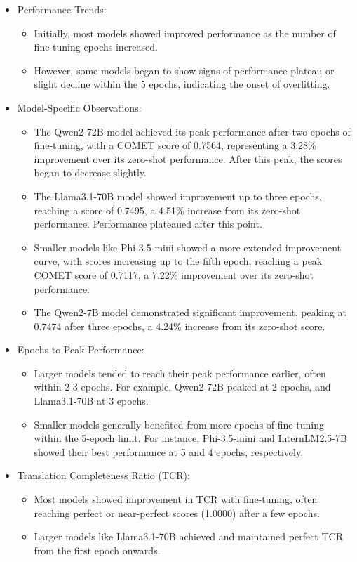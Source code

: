 \documentclass[conference]{IEEEtran}
\begin{document}
\begin{itemize}
    \item Performance Trends:
    \begin{itemize}
        \item Initially, most models showed improved performance as the number of fine-tuning epochs increased.
        \item However, some models began to show signs of performance plateau or slight decline within the 5 epochs, indicating the onset of overfitting.
    \end{itemize}

    \item Model-Specific Observations:
    \begin{itemize}
        \item The Qwen2-72B model achieved its peak performance after two epochs of fine-tuning, with a COMET score of 0.7564, representing a 3.28\% improvement over its zero-shot performance. After this peak, the scores began to decrease slightly.
        \item The Llama3.1-70B model showed improvement up to three epochs, reaching a score of 0.7495, a 4.51\% increase from its zero-shot performance. Performance plateaued after this point.
        \item Smaller models like Phi-3.5-mini showed a more extended improvement curve, with scores increasing up to the fifth epoch, reaching a peak COMET score of 0.7117, a 7.22\% improvement over its zero-shot performance.
        \item The Qwen2-7B model demonstrated significant improvement, peaking at 0.7474 after three epochs, a 4.24\% increase from its zero-shot score.
    \end{itemize}

    \item Epochs to Peak Performance:
    \begin{itemize}
        \item Larger models tended to reach their peak performance earlier, often within 2-3 epochs. For example, Qwen2-72B peaked at 2 epochs, and Llama3.1-70B at 3 epochs.
        \item Smaller models generally benefited from more epochs of fine-tuning within the 5-epoch limit. For instance, Phi-3.5-mini and InternLM2.5-7B showed their best performance at 5 and 4 epochs, respectively.
    \end{itemize}

    \item Translation Completeness Ratio (TCR):
    \begin{itemize}
        \item Most models showed improvement in TCR with fine-tuning, often reaching perfect or near-perfect scores (1.0000) after a few epochs.
        \item Larger models like Llama3.1-70B achieved and maintained perfect TCR from the first epoch onwards.
    \end{itemize}


\end{itemize}
\end{document}
